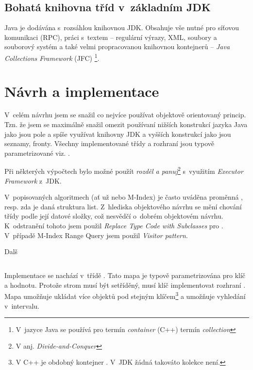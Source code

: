 \subsection{Bohatá knihovna tříd v~základním JDK}

Java je dodávána s~rozsáhlou knihovnou JDK. Obsahuje vše nutné
pro síťovou komunikaci (RPC), práci s~textem -- regulární výrazy,
XML, soubory a souborový
systém a také velmi propracovanou knihovnou kontejnerů -- \emph{Java
Collections Framework }(JFC)
\footnote{V~jazyce Java se používá pro termín \emph{container} (C++) termín
\emph{collection}}.

\section{Návrh a implementace}
V~celém návrhu jsem se snažil co nejvíce používat objektově orientovaný princip. Tzn. že jsem se maximálně snažil omezit používaní nižších konstrukcí jazyka Java jako jsou pole a spíše využívat knihovny JDK a vyšších konstrukcí jako jsou seznamy, fronty. Všechny implementované třídy a rozhraní jsou typově parametrizované viz. .

Při některých výpočtech bylo možné použít \emph{rozděl a panuj}\cite{Cormen:2001:IA:580470}\footnote{V anj. \emph{Divide-and-Conquer}} s~využitím \emph{Executor Framework} z~JDK.

V~popisovaných algoritmech (ať už \BPTree{} nebo M-Index) je často uváděna proměnná , resp. zda je daná struktura list. Z~hlediska objektového návrhu se mění chování třídy podle její datové složky, což nesvědčí o~dobrém objektovém návrhu. K~odstranění tohoto jsem použil \emph{Replace Type Code with Subclasses}\cite{fowler1999refactoring} pro \BPTree. V~případě M-Index Range Query jsem použil \emph{Visitor pattern}\cite{gamma1995design}.

Dalš
\subsection{\BPTree}
Implementace \BPTree{} se nachází v~třídě \linebreak {}. Tato mapa je typově parametrizována pro klíč a hodnotu. Protože strom musí být setříděný, musí klíč implementovat rozhraní . Mapa umožňuje ukládat více objektů pod stejným klíčem\footnote{V C++ je obdobný kontejner \cite{ISO:2012:CPP}. V~JDK žádná takováto kolekce není.} a umožňuje vyhledání v~intervalu.

